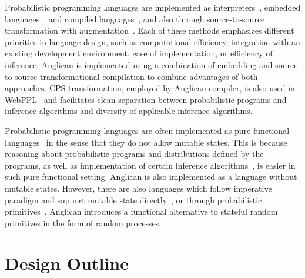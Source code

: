 \documentclass[preprint]{sigplanconf}
\begin{document}
Probabilistic programming languages are implemented as
interpreters~\cite{GMR+08,MSP14}, embedded
languages~\cite{P09,SGG15,GSX+16}, and compiled
languages~\cite{MMR+07,SDT14}, and also through source-to-source
transformation with augmentation~\cite{WSG11,GS15}. Each of
these methods emphasizes different priorities in language
design, such as computational efficiency, integration with an
existing development environment, ease of implementation, or
efficiency of inference. Anglican is implemented using a
combination of embedding and source-to-source transformational
compilation to combine advantages of both approaches.  CPS
transformation, employed by Anglican compiler, is also used in
WebPPL~\cite{GS15} and facilitates clean separation between
probabilistic programs and inference algorithms and diversity of
applicable inference algorithms.

Probabilistic programming languages are often implemented as
pure functional languages~\cite{GMR+08,MSP14,SGG15} in
the sense that they do not allow mutable states. This is
because reasoning about probabilistic programs and distributions
defined by the programs, as well as implementation of certain
inference algorithms~\cite{MYM+15}, is easier in such pure functional
setting. Anglican is also implemented as a language without
mutable states.  However, there are also languages which follow
imperative paradigm and support mutable state
directly~\cite{SDT14,GSX+16}, or through probabilistic
primitives~\cite{GMR+08,MSP14}. Anglican introduces a functional
alternative to stateful random primitives in the form of random
processes.

\section{Design Outline}
\label{sec:design}
\end{document}
